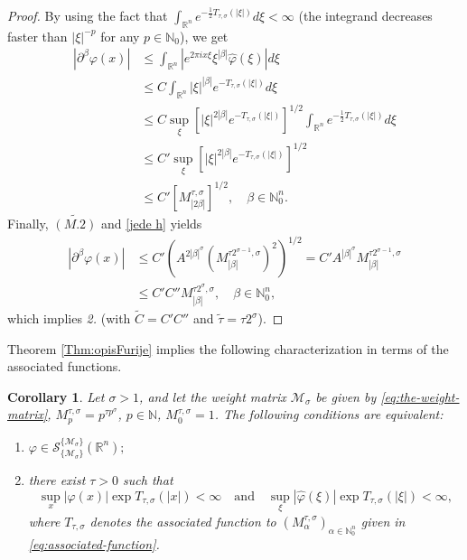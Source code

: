 \documentclass{article}
\theoremstyle{thmstyleone}
\newtheorem{Corollary}[Theorem]{Corollary}%
\theoremstyle{thmstyletwo}%
\theoremstyle{thmstylethree}%
\begin{document}
\begin{proof}
By using the fact that
$ \displaystyle 
\int_{\mathbb R^n}e^{-\frac{1}{2}T_{\tau,\sigma}(|\xi|)}d\xi < \infty$ 
(the integrand decreases faster than $|\xi|^{-p}$ for any $p\in\mathbb N_0$), we get
\begin{align*}
    |\partial^\beta \varphi(x)| & \leq \int_{\mathbb R^n}|e^{2\pi ix\xi}\xi^{|\beta|}\widehat\varphi(\xi)|d\xi\\
    &\leq C \int_{\mathbb R^n}|\xi|^{|\beta|}e^{-T_{\tau,\sigma}(|\xi|)}d\xi\\
    & \leq C \sup_{\xi}[|\xi|^{2|\beta|}e^{-T_{\tau,\sigma}(|\xi|)}]^{1/2}\int_{\mathbb R^n}e^{-\frac{1}{2}T_{\tau,\sigma}(|\xi|)}d\xi\\
    & \leq C' \sup_{\xi}[|\xi|^{2|\beta|}e^{-T_{\tau,\sigma}(|\xi|)}]^{1/2}\\
    &\leq C' [M_{|2\beta|}^{\tau,\sigma}]^{1/2},\quad \beta\in\mathbb N_0^n.
\end{align*}
Finally, $\widetilde{(M.2)}$ and \eqref{jede h} yields
\begin{align*}
     |\partial^\beta \varphi(x)| & \leq C'
(A^{2|\beta|^\sigma} (M_{|\beta|}^{\tau 2^{\sigma-1},\sigma})^2)^{1/2} = C'A^{|\beta|^\sigma} M_{|\beta|}^{\tau 2^{\sigma-1},\sigma}\\
& \leq C'C'' M_{|\beta|}^{\tau2^\sigma,\sigma},\quad \beta\in\mathbb N_0^n,
\end{align*}
 which implies {\em 2.} (with $\tilde C= C' C''$ and $\tilde \tau=\tau 2^\sigma$).
\end{proof}

Theorem \ref{Thm:opisFurije} implies the following characterization in terms of the associated functions.

\begin{Corollary}
    Let $\sigma>1$, and let the weight matrix $\mathcal{M}_\sigma$ be given by \eqref{eq:the-weight-matrix}, 
$ M_{p}^{\tau,\sigma}=p^{\tau p^\sigma}$, $ p\in \mathbb{N}$, $ M_0^{\tau,\sigma}=1$.     
    The following conditions are equivalent:
    \begin{enumerate}
\item 
$\varphi\in  \mathcal S_{\{\mathcal{M}_\sigma\}}^{\{\mathcal{M}_\sigma\}} (\mathbb R^n);$
\item there exist $\tau>0$ such that
$$
        \sup_x|\varphi(x)| \exp T_{\tau,\sigma}(|x|)<\infty \quad \text{and}\quad \sup_\xi|\widehat\varphi(\xi)| \exp T_{\tau,\sigma}(|\xi|)<\infty,
$$
where $T_{\tau,\sigma}$ denotes the associated function to $(M_{\alpha}^{\tau,\sigma})_{\alpha\in\mathbb N_0^n}$ given in  
    \eqref{eq:associated-function}.
    \end{enumerate}
\end{Corollary}
\end{document}
